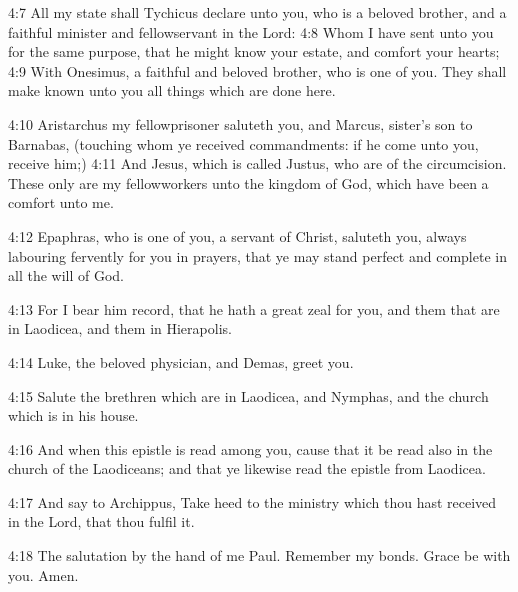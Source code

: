 4:7 All my state shall Tychicus declare unto you, who is a beloved brother, and a faithful minister and fellowservant in the Lord: 4:8 Whom I have sent unto you for the same purpose, that he might know your estate, and comfort your hearts; 4:9 With Onesimus, a faithful and beloved brother, who is one of you. They shall make known unto you all things which are done here.

4:10 Aristarchus my fellowprisoner saluteth you, and Marcus, sister's son to Barnabas, (touching whom ye received commandments: if he come unto you, receive him;) 4:11 And Jesus, which is called Justus, who are of the circumcision. These only are my fellowworkers unto the kingdom of God, which have been a comfort unto me.

4:12 Epaphras, who is one of you, a servant of Christ, saluteth you, always labouring fervently for you in prayers, that ye may stand perfect and complete in all the will of God.

4:13 For I bear him record, that he hath a great zeal for you, and them that are in Laodicea, and them in Hierapolis.

4:14 Luke, the beloved physician, and Demas, greet you.

4:15 Salute the brethren which are in Laodicea, and Nymphas, and the church which is in his house.

4:16 And when this epistle is read among you, cause that it be read also in the church of the Laodiceans; and that ye likewise read the epistle from Laodicea.

4:17 And say to Archippus, Take heed to the ministry which thou hast received in the Lord, that thou fulfil it.

4:18 The salutation by the hand of me Paul. Remember my bonds. Grace be with you. Amen.

